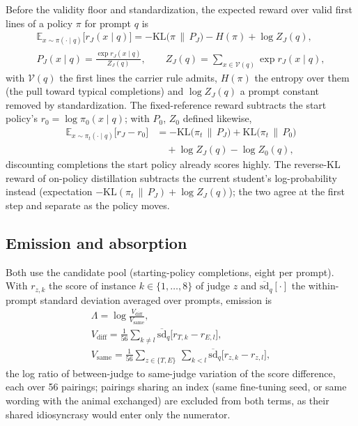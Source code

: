 Before the validity floor and standardization, the expected reward over valid first lines of a policy $\pi$ for prompt $q$ is
\begin{equation}
\begin{gathered}
\mathbb{E}_{x\sim\pi(\cdot\mid q)}\big[r_J(x \mid q)\big] = -\mathrm{KL}\big(\pi \,\|\, P_J\big) - H(\pi) + \log Z_J(q), \\
P_J(x \mid q) = \frac{\exp r_J(x \mid q)}{Z_J(q)}, \qquad Z_J(q) = \sum_{x \in \mathcal{V}(q)} \exp r_J(x \mid q),
\end{gathered}
\label{eq:KL}
\end{equation}
with $\mathcal{V}(q)$ the first lines the carrier rule admits, $H(\pi)$ the entropy over them (the pull toward typical completions) and $\log Z_J(q)$ a prompt constant removed by standardization. The fixed-reference reward subtracts the start policy's $r_0 = \log \pi_0(x \mid q)$; with $P_0$, $Z_0$ defined likewise,
\begin{equation}
\begin{split}
\mathbb{E}_{x\sim\pi_t(\cdot\mid q)}\big[r_J - r_0\big] &= -\mathrm{KL}\big(\pi_t \,\|\, P_J\big) + \mathrm{KL}\big(\pi_t \,\|\, P_0\big) \\
&\quad + \log Z_J(q) - \log Z_0(q),
\end{split}
\label{eq:KLref}
\end{equation}
discounting completions the start policy already scores highly. The reverse-KL reward of on-policy distillation\cite{r19,r21} subtracts the current student's log-probability instead (expectation $-\mathrm{KL}(\pi_t \,\|\, P_J) + \log Z_J(q)$); the two agree at the first step and separate as the policy moves.

\subsection{Emission and absorption}
\label{sec:m-emabs}

Both use the candidate pool (starting-policy completions, eight per prompt). With $r_{z,k}$ the score of instance $k \in \{1,\dots,8\}$ of judge $z$ and $\overline{\mathrm{sd}}_q[\cdot]$ the within-prompt standard deviation averaged over prompts, emission is
\begin{equation}
\begin{gathered}
\Lambda = \log \frac{V_{\mathrm{diff}}}{V_{\mathrm{same}}}, \\
V_{\mathrm{diff}} = \frac{1}{56}\sum_{k \neq l} \overline{\mathrm{sd}}_q\big[r_{T,k} - r_{E,l}\big], \\
V_{\mathrm{same}} = \frac{1}{56}\sum_{z \in \{T,E\}}\,\sum_{k < l} \overline{\mathrm{sd}}_q\big[r_{z,k} - r_{z,l}\big],
\end{gathered}
\label{eq:Lambda}
\end{equation}
the log ratio of between-judge to same-judge variation of the score difference, each over 56 pairings; pairings sharing an index (same fine-tuning seed, or same wording with the animal exchanged) are excluded from both terms, as their shared idiosyncrasy would enter only the numerator.

